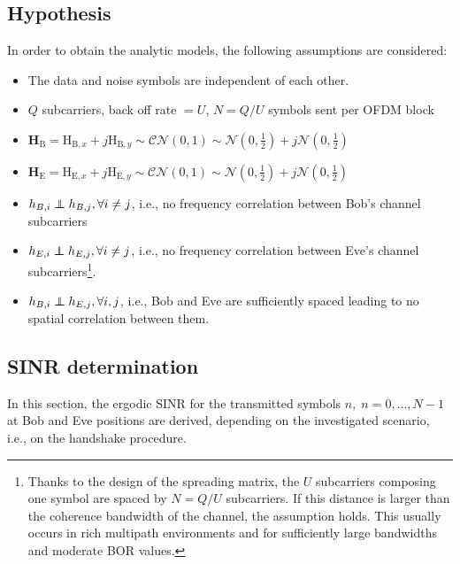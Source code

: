 \documentclass[journal,comsoc]{IEEEtran}
\newcommand{\HE}{\textbf{H}_{\text{E}}}
\newcommand{\HB}{\textbf{H}_{\text{B}}}
\newcommand{\mat}[1]{\boldsymbol{\mathrm{#1}}}
\newcommand\independent{\protect\mathpalette{\protect\independenT}{\perp}}
\def\independenT#1#2{\mathrel{\rlap{$#1#2$}\mkern2mu{#1#2}}}
\begin{document}

\subsection{Hypothesis}
In order to obtain the analytic models, the following assumptions are considered:
\begin{itemize}
	\item The data and noise symbols are independent of each other. 
	\item $Q$ subcarriers, back off rate $= U$, $N = Q/U$ symbols sent per OFDM block
	\item  $\HB = \mat{H}_{\text{B},x} + j\mat{H}_{\text{B},y} \sim \mathcal{CN}(0,1) \sim \mathcal{N}(0,\frac{1}{2}) + j \mathcal{N}(0,\frac{1}{2}) $
	\item  $\HE = \mat{H}_{\text{E},x} + j\mat{H}_{\text{E},y} \sim \mathcal{CN}(0,1) \sim \mathcal{N}(0,\frac{1}{2}) + j \mathcal{N}(0,\frac{1}{2}) $
	\item $h_{B,i} \independent h_{B,j}, \forall i \neq j$, i.e., no frequency correlation between Bob's channel subcarriers
	\item $h_{E,i} \independent h_{E,j}, \forall i \neq j$, i.e., no frequency correlation between Eve's channel subcarriers\footnote{Thanks to the design of the spreading matrix, the $U$ subcarriers composing one symbol are spaced by $N = Q/U$ subcarriers. If this distance is larger than the coherence bandwidth of the channel, the assumption holds. This usually occurs in rich multipath environments and for sufficiently large bandwidths and moderate BOR values.}.
	\item $h_{B,i} \independent h_{E,j}, \forall i,j$, i.e., Bob and Eve are sufficiently spaced leading to no spatial correlation between them.
\end{itemize}


\subsection{SINR determination}
In this section, the ergodic SINR for the transmitted symbols $n, \; n = 0,...,N-1$ at Bob and Eve positions are derived, depending on the investigated scenario, i.e., on the handshake procedure. 



\end{document}
